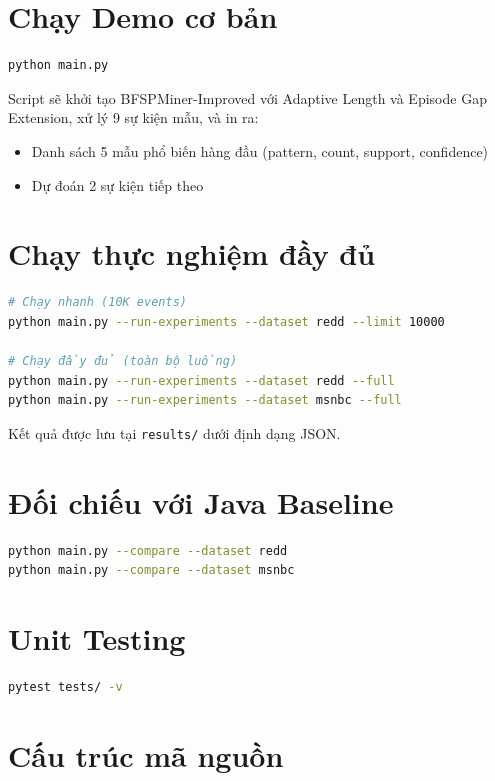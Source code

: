 \documentclass[a4paper,12pt]{report}
\begin{document}
\section{Chạy Demo cơ bản}
\begin{lstlisting}[language=bash, caption={Chay demo toy stream}]
python main.py
\end{lstlisting}

Script sẽ khởi tạo BFSPMiner-Improved với Adaptive Length và Episode Gap Extension, xử lý 9 sự kiện mẫu, và in ra:
\begin{itemize}
    \item Danh sách 5 mẫu phổ biến hàng đầu (pattern, count, support, confidence)
    \item Dự đoán 2 sự kiện tiếp theo
\end{itemize}

\section{Chạy thực nghiệm đầy đủ}
\begin{lstlisting}[language=bash, caption={Chay benchmark suite}]
# Chạy nhanh (10K events)
python main.py --run-experiments --dataset redd --limit 10000

# Chạy đầy đủ (toàn bộ luồng)
python main.py --run-experiments --dataset redd --full
python main.py --run-experiments --dataset msnbc --full
\end{lstlisting}

Kết quả được lưu tại \texttt{results/} dưới định dạng JSON.

\section{Đối chiếu với Java Baseline}
\begin{lstlisting}[language=bash, caption={So sanh Python vs Java}]
python main.py --compare --dataset redd
python main.py --compare --dataset msnbc
\end{lstlisting}

\section{Unit Testing}
\begin{lstlisting}[language=bash, caption={Chay kiem thu}]
pytest tests/ -v
\end{lstlisting}

\section{Cấu trúc mã nguồn}
\end{document}
